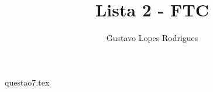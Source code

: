 \documentclass[10pt,a4paper]{article}
\author{Gustavo Lopes Rodrigues}
\title{Lista 2 - FTC}
\begin{document}
	\maketitle

	
	{questao7.tex}
	
\end{document}
